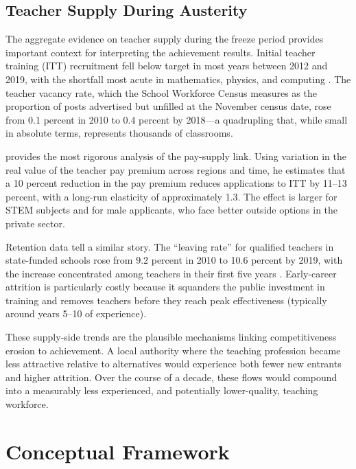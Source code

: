 \documentclass[12pt]{article}
\begin{document}
\subsection{Teacher Supply During Austerity}

The aggregate evidence on teacher supply during the freeze period provides important context for interpreting the achievement results. Initial teacher training (ITT) recruitment fell below target in most years between 2012 and 2019, with the shortfall most acute in mathematics, physics, and computing \citep{allen2018teacher, epi2019teacher}. The teacher vacancy rate, which the School Workforce Census measures as the proportion of posts advertised but unfilled at the November census date, rose from 0.1 percent in 2010 to 0.4 percent by 2018---a quadrupling that, while small in absolute terms, represents thousands of classrooms.

\citet{sims2020teacher} provides the most rigorous analysis of the pay-supply link. Using variation in the real value of the teacher pay premium across regions and time, he estimates that a 10 percent reduction in the pay premium reduces applications to ITT by 11--13 percent, with a long-run elasticity of approximately 1.3. The effect is larger for STEM subjects and for male applicants, who face better outside options in the private sector.

Retention data tell a similar story. The ``leaving rate'' for qualified teachers in state-funded schools rose from 9.2 percent in 2010 to 10.6 percent by 2019, with the increase concentrated among teachers in their first five years \citep{ifs2019teacher}. Early-career attrition is particularly costly because it squanders the public investment in training and removes teachers before they reach peak effectiveness (typically around years 5--10 of experience).

These supply-side trends are the plausible mechanisms linking competitiveness erosion to achievement. A local authority where the teaching profession became less attractive relative to alternatives would experience both fewer new entrants and higher attrition. Over the course of a decade, these flows would compound into a measurably less experienced, and potentially lower-quality, teaching workforce.

\section{Conceptual Framework}\label{sec:framework}
\end{document}
